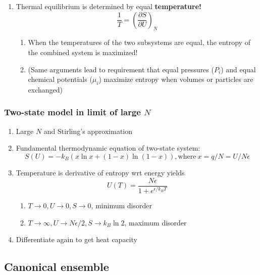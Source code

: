 \documentclass[11pt]{article}
\begin{document}
\begin{enumerate}
\item Thermal equilibrium is determined by equal \textbf{temperature!}
\begin{displaymath}
    \frac{1}{T}=\left ( \frac{\partial S}{\partial U} \right )_N
  \end{displaymath}
\begin{enumerate}
\item When the temperatures of the two subsystems are equal, the
entropy of the combined system is maximized!
\item (Same arguments lead to requirement that equal pressures (\(P_i\)) and
equal chemical potentials (\(\mu_i\)) maximize entropy when volumes or
particles are exchanged)
\end{enumerate}
\end{enumerate}

\subsubsection{Two-state model in limit of large \(N\)}
\label{sec:orgf29ccff}
\begin{enumerate}
\item Large \(N\) and Stirling's approximation
\item Fundamental thermodynamic equation of two-state system:
\begin{displaymath}
  S(U)=-k_B \left ( x \ln x + (1-x) \ln (1-x) \right ), \mathrm{where}\
  x = q/N = U/N\epsilon
\end{displaymath}
\item Temperature is derivative of entropy wrt energy yields
\begin{displaymath}
  U(T) = \frac{N\epsilon}{1+e^{\epsilon/k_BT}}
\end{displaymath}
\begin{enumerate}
\item \(T \rightarrow 0, U \rightarrow 0, S \rightarrow 0\), minimum disorder
\item \(T \rightarrow \infty, U \rightarrow N\epsilon/2, S \rightarrow
              k_B \ln 2\), maximum disorder
\end{enumerate}
\item Differentiate again to get heat capacity
\end{enumerate}

\subsection{Canonical ensemble}
\label{sec:orgb965107}
\end{document}
